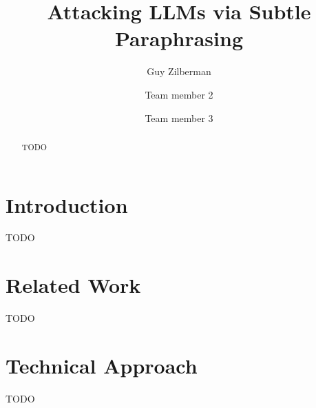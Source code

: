 \documentclass[sigconf,nonacm]{acmart}
\begin{document}
\title{Attacking LLMs via Subtle Paraphrasing}

\author{Guy Zilberman}
\author{Team member 2}
\author{Team member 3}

\begin{abstract}
TODO
\end{abstract}

\maketitle

\section{Introduction}
TODO

\section{Related Work}
TODO

\section{Technical Approach}
TODO
\end{document}
